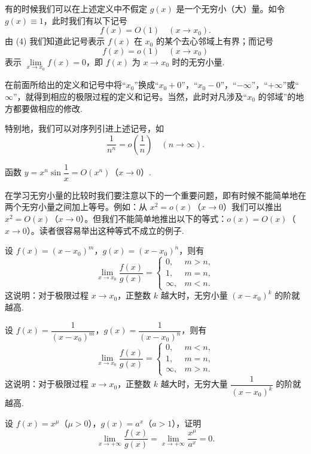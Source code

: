 有的时候我们可以在上述定义中不假定 $g(x)$ 是一个无穷小（大）量。如令 $g(x)\equiv1$，此时我们有以下记号
\[
  f(x)=O(1)\quad(x\to x_0).
\]
由 (4) 我们知道此记号表示 $f(x)$ 在 $x_0$ 的某个去心邻域上有界；而记号
\[
  f(x)=o(1)\quad(x\to x_0)
\]
表示 $\lim\limits_{x\to x_0}f(x)=0$，即 $f(x)$ 为 $x\to x_0$ 时的无穷小量.

在前面所给出的定义和记号中将“$x_0$”换成“$x_0+0$”，“$x_0-0$”，“$-\infty$”，“$+\infty$”或“$\infty$”，就得到相应的极限过程的定义和记号。当然，此时对凡涉及“$x_0$ 的邻域”的地方都要做相应的修改.

特别地，我们可以对序列引进上述记号，如
\[
  \frac1{n^n}=o\left(\frac1n\right)\quad(n\to\infty).
\]

\begin{example}\label{example:ma-3-4-1}
函数 $y=x^n\sin\dfrac1x=O(x^n)$（$x\to0$）.
\end{example}

在学习无穷小量的比较时我们要注意以下的一个重要问题，即有时候不能简单地在两个无穷小量之间加上等号。例如：从 $x^2=o(x)$（$x\to0$）我们可以推出 $x^2=O(x)$（$x\to0$）。但我们不能简单地推出以下的等式：$o(x)=O(x)$（$x\to0$）。读者很容易举出这种等式不成立的例子.

\begin{example}\label{example:ma-3-4-2}
设 $f(x)=(x-x_0)^m$，$g(x)=(x-x_0)^n$，则有
\[
  \lim_{x\to x_0}\frac{f(x)}{g(x)}
  =
  \begin{cases}
    0, & m>n,\\
    1, & m=n,\\
    \infty, & m<n.
  \end{cases}
\]
这说明：对于极限过程 $x\to x_0$，正整数 $k$ 越大时，无穷小量 $(x-x_0)^k$ 的阶就越高.
\end{example}


\begin{example}\label{example:ma-3-4-3}
设 $f(x)=\dfrac1{(x-x_0)^m}$，$g(x)=\dfrac1{(x-x_0)^n}$，则有
\[
  \lim_{x\to x_0}\frac{f(x)}{g(x)}
  =
  \begin{cases}
    0, & m<n,\\
    1, & m=n,\\
    \infty, & m>n.
  \end{cases}
\]
这说明：对于极限过程 $x\to x_0$，正整数 $k$ 越大时，无穷大量 $\dfrac1{(x-x_0)^k}$ 的阶就越高.
\end{example}


\begin{example}\label{example:ma-3-4-4}
设 $f(x)=x^\mu$（$\mu>0$），$g(x)=a^x$（$a>1$），证明
\[
  \lim_{x\to+\infty}\frac{f(x)}{g(x)}
  =
  \lim_{x\to+\infty}\frac{x^\mu}{a^x}=0.
\]
\end{example}


